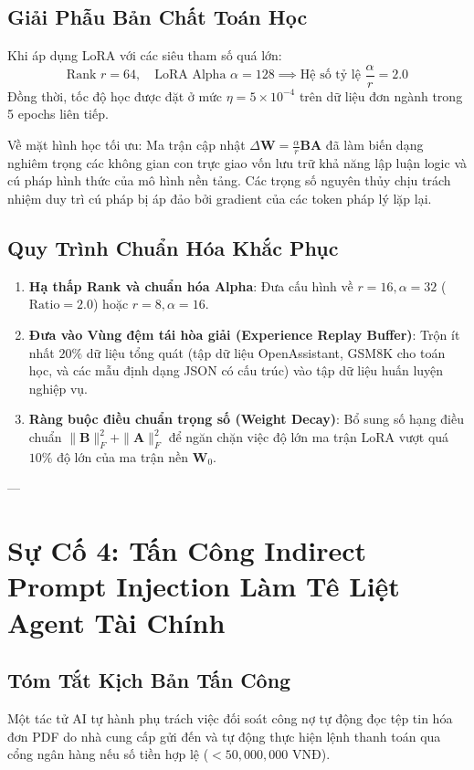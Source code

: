 \subsection{Giải Phẫu Bản Chất Toán Học}
Khi áp dụng LoRA với các siêu tham số quá lớn:
\begin{equation*}
\text{Rank } r = 64, \quad \text{LoRA Alpha } \alpha = 128 \implies \text{Hệ số tỷ lệ } \frac{\alpha}{r} = 2.0
\end{equation*}
Đồng thời, tốc độ học được đặt ở mức $\eta = 5 \times 10^{-4}$ trên dữ liệu đơn ngành trong 5 epochs liên tiếp.

Về mặt hình học tối ưu: Ma trận cập nhật $\Delta \mathbf{W} = \frac{\alpha}{r} \mathbf{B}\mathbf{A}$ đã làm biến dạng nghiêm trọng các không gian con trực giao vốn lưu trữ khả năng lập luận logic và cú pháp hình thức của mô hình nền tảng. Các trọng số nguyên thủy chịu trách nhiệm duy trì cú pháp bị áp đảo bởi gradient của các token pháp lý lặp lại.

\subsection{Quy Trình Chuẩn Hóa Khắc Phục}
\begin{enumerate}
  \item \textbf{Hạ thấp Rank và chuẩn hóa Alpha}: Đưa cấu hình về $r = 16, \alpha = 32$ ($\text{Ratio} = 2.0$) hoặc $r = 8, \alpha = 16$.
  \item \textbf{Đưa vào Vùng đệm tái hòa giải (Experience Replay Buffer)}: Trộn ít nhất $20\%$ dữ liệu tổng quát (tập dữ liệu OpenAssistant, GSM8K cho toán học, và các mẫu định dạng JSON có cấu trúc) vào tập dữ liệu huấn luyện nghiệp vụ.
  \item \textbf{Ràng buộc điều chuẩn trọng số (Weight Decay)}: Bổ sung số hạng điều chuẩn $\|\mathbf{B}\|_F^2 + \|\mathbf{A}\|_F^2$ để ngăn chặn việc độ lớn ma trận LoRA vượt quá $10\%$ độ lớn của ma trận nền $\mathbf{W}_0$.
\end{enumerate}

---

\section{Sự Cố 4: Tấn Công Indirect Prompt Injection Làm Tê Liệt Agent Tài Chính}
\label{sec:postmortem-indirect-prompt-injection}

\subsection{Tóm Tắt Kịch Bản Tấn Công}
Một tác tử AI tự hành phụ trách việc đối soát công nợ tự động đọc tệp tin hóa đơn PDF do nhà cung cấp gửi đến và tự động thực hiện lệnh thanh toán qua cổng ngân hàng nếu số tiền hợp lệ ($< 50,000,000\text{ VNĐ}$).

